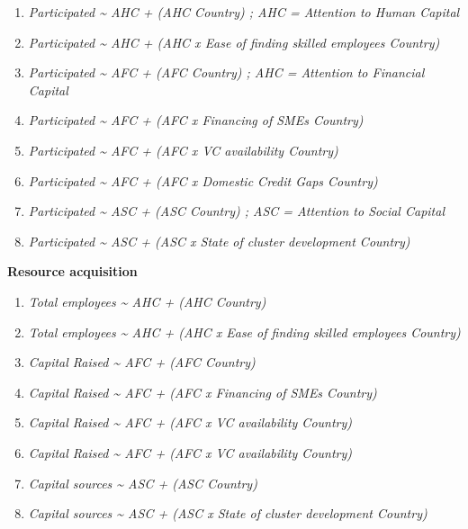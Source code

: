 \documentclass[
  english,
  man]{apa6}
\providecommand{\tightlist}{%
  \setlength{\itemsep}{0pt}\setlength{\parskip}{0pt}}
\begin{document}
\begin{enumerate}
\def\labelenumi{(\arabic{enumi})}
\tightlist
\item
  \emph{Participated \textasciitilde{} AHC + (AHC \textbar{} Country) ; AHC = Attention to Human Capital}
\item
  \emph{Participated \textasciitilde{} AHC + (AHC x Ease of finding skilled employees \textbar{} Country)}
\item
  \emph{Participated \textasciitilde{} AFC + (AFC \textbar{} Country) ; AHC = Attention to Financial Capital}
\item
  \emph{Participated \textasciitilde{} AFC + (AFC x Financing of SMEs\textbar{} Country)}\\
\item
  \emph{Participated \textasciitilde{} AFC + (AFC x VC availability \textbar{} Country)}\\
\item
  \emph{Participated \textasciitilde{} AFC + (AFC x Domestic Credit Gaps \textbar{} Country)}\\
\item
  \emph{Participated \textasciitilde{} ASC + (ASC \textbar{} Country) ; ASC = Attention to Social Capital}\\
\item
  \emph{Participated \textasciitilde{} ASC + (ASC x State of cluster development \textbar{} Country)}
\end{enumerate}

\textbf{Resource acquisition}

\begin{enumerate}
\def\labelenumi{(\arabic{enumi})}
\setcounter{enumi}{8}
\tightlist
\item
  \emph{Total employees \textasciitilde{} AHC + (AHC \textbar{} Country)}
\item
  \emph{Total employees \textasciitilde{} AHC + (AHC x Ease of finding skilled employees \textbar{} Country)}
\item
  \emph{Capital Raised \textasciitilde{} AFC + (AFC \textbar{} Country)}
\item
  \emph{Capital Raised \textasciitilde{} AFC + (AFC x Financing of SMEs\textbar{} Country)}
\item
  \emph{Capital Raised \textasciitilde{} AFC + (AFC x VC availability \textbar{} Country)}
\item
  \emph{Capital Raised \textasciitilde{} AFC + (AFC x VC availability \textbar{} Country)}
\item
  \emph{Capital sources \textasciitilde{} ASC + (ASC \textbar{} Country)}\\
\item
  \emph{Capital sources \textasciitilde{} ASC + (ASC x State of cluster development \textbar{} Country)}
\end{enumerate}
\end{document}

